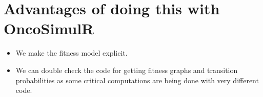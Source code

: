 \documentclass[11pt]{article}
\begin{document}
\section{Advantages of doing this with OncoSimulR}
\label{sec:org4a55091}
\begin{itemize}
\item We make the fitness model explicit.
\item We can double check the code for getting fitness graphs and transition
probabilities as some critical computations are being done with very
different code.
\end{itemize}
\end{document}
